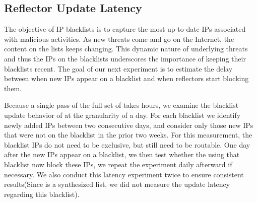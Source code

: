 \subsection{Reflector Update Latency}
\label{sec:latency-analysis}

The objective of IP blacklists is to capture the most up-to-date IPs
associated with malicious activities. As new threats come and go on
the Internet, the content on the lists keeps changing. This dynamic
nature of underlying threats and thus the IPs on the blacklists
underscores the importance of {} keeping their blacklists
recent.
The goal of our next experiment is to estimate the delay between when
new IPs appear on a blacklist and when reflectors start blocking them.




Because a single pass of the full set of {} takes hours, we
examine the blacklist update behavior of {} at the
granularity of a day.  For each blacklist we identify newly added IPs
between two consecutive days, and consider only those new IPs that
were not on the blacklist in the prior two weeks.  For this
measurement, the blacklist IPs do not need to be exclusive, but still
need to be routable.  One day after the new IPs appear on a blacklist,
we then test whether the {} using that blacklist now block
these IPs, we repeat the experiment daily afterward if necessary.
We also conduct this latency experiment twice to ensure consistent
results(Since {\ettor} is a synthesized list, we did not measure
the update latency regarding this blacklist).


